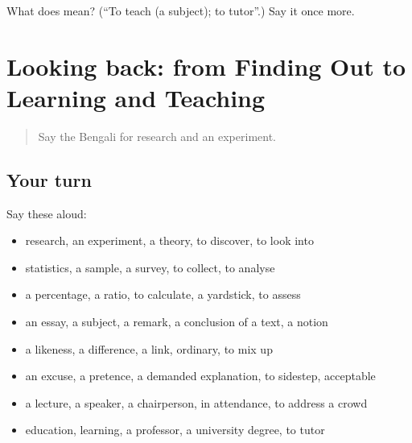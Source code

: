 \begin{tcolorbox}[breakable,colback=teal!4,colframe=teal!35!black,title={Before you move on}]
What does  mean? (\textquotedblleft{}To teach (a subject); to tutor\textquotedblright{}.) Say it once more.
\end{tcolorbox}
\section[(dialogue)]{Looking back: from Finding Out to Learning and Teaching}

\label{lesson:BN-R361-review-354-361}



\begin{quote}
Say the Bengali for research and an experiment.
\end{quote}

\subsection*{Your turn}
Say these aloud:

\begin{itemize}
\raggedright
  \item research, an experiment, a theory, to discover, to look into
  \item statistics, a sample, a survey, to collect, to analyse
  \item a percentage, a ratio, to calculate, a yardstick, to assess
  \item an essay, a subject, a remark, a conclusion of a text, a notion
  \item a likeness, a difference, a link, ordinary, to mix up
  \item an excuse, a pretence, a demanded explanation, to sidestep, acceptable
  \item a lecture, a speaker, a chairperson, in attendance, to address a crowd
  \item education, learning, a professor, a university degree, to tutor
\end{itemize}

